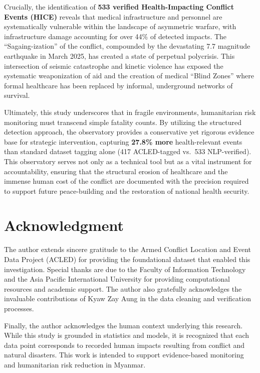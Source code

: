 \documentclass[conference]{IEEEtran}
\begin{document}
Crucially, the identification of \textbf{533 verified Health-Impacting Conflict Events (HICE)} reveals that medical infrastructure and personnel are systematically vulnerable within the landscape of asymmetric warfare, with infrastructure damage accounting for over 44\% of detected impacts. The ``Sagaing-ization'' of the conflict, compounded by the devastating 7.7 magnitude earthquake in March 2025, has created a state of perpetual polycrisis. This intersection of seismic catastrophe and kinetic violence has exposed the systematic weaponization of aid and the creation of medical ``Blind Zones'' where formal healthcare has been replaced by informal, underground networks of survival.

Ultimately, this study underscores that in fragile environments, humanitarian risk monitoring must transcend simple fatality counts. By utilizing the structured detection approach, the observatory provides a conservative yet rigorous evidence base for strategic intervention, capturing \textbf{27.8\% more} health-relevant events than standard dataset tagging alone (417 ACLED-tagged vs.\ 533 NLP-verified). This observatory serves not only as a technical tool but as a vital instrument for accountability, ensuring that the structural erosion of healthcare and the immense human cost of the conflict are documented with the precision required to support future peace-building and the restoration of national health security.
\section{Acknowledgment}

The author extends sincere gratitude to the Armed Conflict Location and Event Data Project (ACLED) for providing the foundational dataset that enabled this investigation. Special thanks are due to the Faculty of Information Technology and the Asia Pacific International University for providing computational resources and academic support. The author also gratefully acknowledges the invaluable contributions of Kyaw Zay Aung in the data cleaning and verification processes. 

Finally, the author acknowledges the human context underlying this research. While this study is grounded in statistics and models, it is recognized that each data point corresponds to recorded human impacts resulting from conflict and natural disasters. This work is intended to support evidence-based monitoring and humanitarian risk reduction in Myanmar. 



\end{document}
